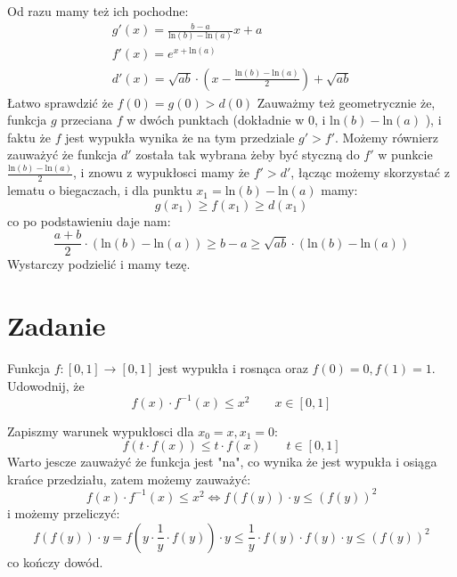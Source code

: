 \documentclass[12pt]{scrartcl}
\begin{document}
    Od razu mamy też ich pochodne:
    \begin{gather*}
      g'(x) = \frac{b - a}{\text{ln} \left ( b \right )  - \text{ln} \left (  a \right ) } x + a\\
      f'(x) = e^{x + \text{ln} \left ( a \right ) } \\
      d'(x) =  \sqrt{ab} \cdot \left ( x - \frac{\text{ln} \left ( b \right ) - \text{ln} \left ( a \right )  }{2} \right )  + \sqrt{ab} 
    \end{gather*}
    Łatwo sprawdzić że $f(0) = g(0) > d(0)$
    Zauważmy też geometrycznie że, funkcja $g$ przeciana $f$ w dwóch punktach (dokładnie w $0$, i $\text{ln} \left ( b \right ) - \text{ln} \left ( a \right )  $ ), i faktu że $f$ jest wypukła wynika że na tym przedziale $g' > f'$. Możemy równierz zauważyć że funkcja $d'$ została tak wybrana żeby być styczną do $f'$ w punkcie $\frac{\text{ln} \left ( b \right ) - \text{ln} \left ( a \right )  }{2}$, i znowu z wypukłosci mamy że $f' > d'$, łącząc możemy skorzystać z lematu o biegaczach, i dla punktu $x_{1} = \text{ln} \left ( b \right ) - \text{ln} \left ( a \right )$ mamy:
    \[
        g(x_{1}) \geq f(x_{1}) \geq d(x_1)
    \]
    co po podstawieniu daje nam:
    \[
        \frac{a+b}{2} \cdot \left ( \text{ln} \left ( b \right ) - \text{ln} \left ( a \right )  \right ) \geq b-a \geq \sqrt{ab} \cdot \left ( \text{ln} \left ( b \right ) - \text{ln} \left ( a \right )  \right ) 
    \]
    Wystarczy podzielić i mamy tezę.
\section{Zadanie}
    
    \begin{zadanie}
        Funkcja $f : [0, 1] \to [0, 1]$ jest wypukła i rosnąca oraz $f (0) = 0, f (1) = 1$. Udowodnij, że
        \[
          f(x) \cdot f^{-1} (x) \leq x^2 \qquad x \in [0,1]
        \]
        
    \end{zadanie}
    
    Zapiszmy warunek wypukłosci dla $x_{0} = x, x_{1} = 0$:
    \[
      f( t \cdot f(x) ) \leq t \cdot f(x) \qquad t \in [0,1]
    \]
    Warto jescze zauważyć że funkcja jest "na", co wynika że jest wypukła i osiąga krańce przedziału, zatem możemy zauważyć:
    \[
      f(x) \cdot f^{-1} (x) \leq x^2 \iff f(f(y)) \cdot y \leq \left ( f(y) \right )^2 
    \]
    i możemy przeliczyć:
    \[
        f(f(y)) \cdot y = f(y \cdot \frac{1}{y} \cdot  f(y) ) \cdot y \leq \frac{1}{y} \cdot f(y) \cdot f(y) \cdot y \leq \left ( f(y) \right )^2
    \]
    co kończy dowód.
\newpage
\end{document}
